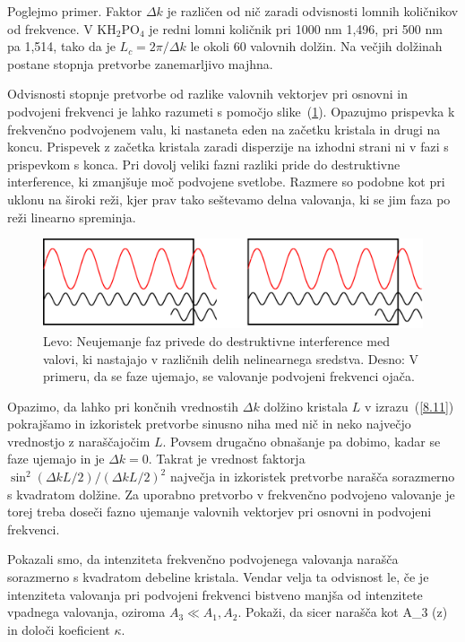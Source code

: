 \documentclass[11pt,fleqn]{book} %
\begin{document}
Poglejmo primer. Faktor $\Delta k$ je različen od nič zaradi odvisnosti
lomnih količnikov od frekvence. V KH$_{2}$PO$_{4}$ je 
redni lomni količnik pri 1000 nm 1,496, pri 500 nm pa 1,514, tako
da je $L_{c}=2\pi /\Delta k$ le okoli 60 valovnih dolžin. Na večjih dolžinah
postane stopnja pretvorbe zanemarljivo majhna.\\

\begin{remark}
Odvisnosti stopnje pretvorbe od razlike valovnih vektorjev pri osnovni
in podvojeni frekvenci je lahko razumeti s pomočjo slike~(\ref{fig:shg1}). Opazujmo
prispevka k frekvenčno podvojenem valu, ki nastaneta eden na začetku kristala
in drugi na koncu. Prispevek z začetka kristala zaradi disperzije na izhodni
strani ni v fazi s prispevkom s konca. Pri dovolj veliki fazni razliki
pride do destruktivne interference, ki zmanjšuje moč podvojene svetlobe.
Razmere so podobne kot pri uklonu na široki reži, kjer prav tako seštevamo
delna valovanja, ki se jim faza po reži linearno spreminja.
\begin{figure}[h]
\centering
\includegraphics[width=10truecm]{slike/08_shg1.png}
\caption{Levo: Neujemanje faz privede do destruktivne interference med valovi, ki nastajajo
v različnih delih nelinearnega sredstva. Desno: V primeru, da se faze ujemajo, se valovanje 
podvojeni frekvenci ojača.}
\label{fig:shg1}
\end{figure}
\end{remark}


Opazimo, da lahko pri končnih vrednostih $\Delta k$ dolžino kristala $L$ v izrazu~(\ref{8.11})
pokrajšamo in izkoristek pretvorbe sinusno niha med nič in neko največjo vrednostjo z naraščajočim
$L$. Povsem drugačno obnašanje pa dobimo, kadar se faze ujemajo in je $\Delta k = 0$. 
Takrat je vrednost faktorja $\sin^{2}(\Delta kL/2)/(\Delta kL/2)^{2}$ največja in izkoristek 
pretvorbe narašča sorazmerno s kvadratom dolžine. Za uporabno pretvorbo v frekvenčno 
podvojeno valovanje je torej treba doseči fazno ujemanje valovnih vektorjev pri 
osnovni in podvojeni frekvenci. 
\begin{definition}
Pokazali smo, da intenziteta frekvenčno podvojenega valovanja narašča sorazmerno s
kvadratom debeline kristala. Vendar velja ta odvisnost le, če je intenziteta valovanja
pri podvojeni frekvenci bistveno manjša od intenzitete vpadnega valovanja, oziroma $A_3 \ll A_1, A_2$.
Pokaži, da sicer narašča kot
\beq
A_3 \propto \tanh (\kappa z)
\eeq
in določi koeficient $\kappa$. 
\end{definition}
\end{document}
